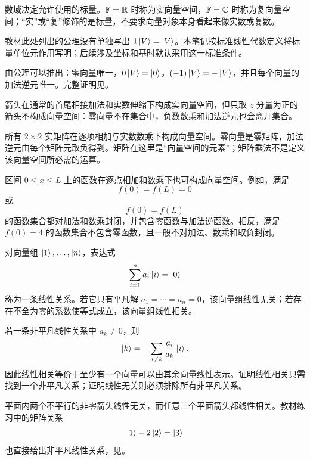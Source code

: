 数域决定允许使用的标量。$\mathbb{F}=\mathbb{R}$ 时称为实向量空间，$\mathbb{F}=\mathbb{C}$ 时称为复向量空间；“实”或“复”修饰的是标量，不要求向量对象本身看起来像实数或复数。

\begin{remark}
教材此处列出的公理没有单独写出 $1\left|V\right\rangle=\left|V\right\rangle$。本笔记按标准线性代数定义将标量单位元作用写明；后续涉及坐标和基时默认采用这一标准条件。
\end{remark}

由公理可以推出：零向量唯一，$0\left|V\right\rangle=\left|0\right\rangle$，$(-1)\left|V\right\rangle=-\left|V\right\rangle$，并且每个向量的加法逆元唯一。完整证明见。


箭头在通常的首尾相接加法和实数伸缩下构成实向量空间，但只取 $z$ 分量为正的箭头不构成向量空间：零向量不在集合中，负数数乘和加法逆元也会离开集合。

所有 $2\times 2$ 实矩阵在逐项相加与实数数乘下构成向量空间。零向量是零矩阵，加法逆元由每个矩阵元取负得到。矩阵在这里是“向量空间的元素”；矩阵乘法不是定义该向量空间所必需的运算。

区间 $0\leq x\leq L$ 上的函数在逐点相加和数乘下也可构成向量空间。例如，满足
\[
  f(0)=f(L)=0
\]
或
\[
  f(0)=f(L)
\]
的函数集合都对加法和数乘封闭，并包含零函数与加法逆函数。相反，满足 $f(0)=4$ 的函数集合不包含零函数，且一般不对加法、数乘和取负封闭。



\begin{definition}
对向量组 $\left|1\right\rangle,\ldots,\left|n\right\rangle$，表达式
\[
  \sum_{i=1}^{n}a_i\left|i\right\rangle=\left|0\right\rangle
\]
称为一条线性关系。若它只有平凡解 $a_1=\cdots=a_n=0$，该向量组线性无关；若存在不全为零的系数使等式成立，该向量组线性相关。
\end{definition}

若一条非平凡线性关系中 $a_k\neq0$，则
\[
  \left|k\right\rangle=-\sum_{i\neq k}\frac{a_i}{a_k}\left|i\right\rangle.
\]
因此线性相关等价于至少有一个向量可以由其余向量线性表示。证明线性相关只需找到一个非平凡关系；证明线性无关则必须排除所有非平凡关系。

平面内两个不平行的非零箭头线性无关，而任意三个平面箭头都线性相关。教材练习中的矩阵关系
\[
  \left|1\right\rangle-2\left|2\right\rangle=\left|3\right\rangle
\]
也直接给出非平凡线性关系，见。

